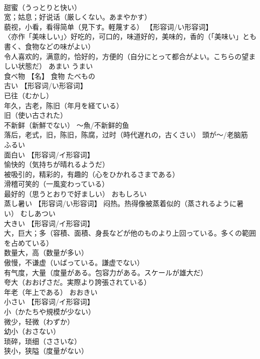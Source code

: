 \documentclass[8pt]{extreport}
\begin{document}
\begin{CJK}{UTF8}{min}
\\	甜蜜（うっとりと快い） 
\\	宽；姑息；好说话（厳しくない。あまやかす） 
\\	藐视，小看，看得简单（見下す。軽蔑する） 【形容词/い形容词】 
\\	〈亦作「美味しい」〉好吃的，可口的，味道好的，美味的，香的（「美味い」とも書く、食物などの味がよい） 
\\	令人喜欢的，满意的，恰好的，方便的（自分にとって都合がよい。こちらの望ましい状態だ）	あまい うまい	
\\	食べ物	【名】 食物	たべもの	
\\	古い	【形容词/い形容词】 
\\	已往（むかし） 
\\	年久，古老，陈旧（年月を経ている） 
\\	旧（使い古された） 
\\	不新鲜（新鮮でない） 〜魚/不新鲜的鱼 
\\	落后，老式，旧，陈旧，陈腐，过时（時代遅れの，古くさい） 頭が〜/老脑筋	ふるい	
\\	面白い	【形容词/イ形容词】 
\\	愉快的（気持ちが晴れるようだ） 
\\	被吸引的，精彩的，有趣的（心をひかれるさまである） 
\\	滑稽可笑的（一風変わっている） 
\\	最好的（思うとおりで好ましい）	おもしろい	
\\	蒸し暑い	【形容词/い形容词】 闷热。热得像被蒸着似的（蒸されるように暑い）	むしあつい	
\\	大きい	【形容词/イ形容词】 
\\	大，巨大；多（容積、面積、身長などが他のものより上回っている。多くの範囲を占めている） 
\\	数量大，高（数量が多い） 
\\	傲慢，不谦虚（いばっている。謙虚でない） 
\\	有气度，大量（度量がある。包容力がある。スケールが雄大だ） 
\\	夸大（おおげさだ。実際より誇張されている） 
\\	年老（年上である）	おおきい	
\\	小さい	【形容词/イ形容词】 
\\	小（かたちや規模が少ない） 
\\	微少，轻微（わずか） 
\\	幼小（おさない） 
\\	琐碎，琐细（ささいな） 
\\	狭小，狭隘（度量がない） 

\end{CJK}
\end{document}

